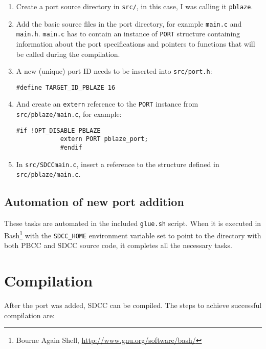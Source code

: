         \begin{enumerate}

        \item Create a port source directory in \texttt{src/}, in this case, I was calling it \texttt{pblaze}.

        \item Add the basic source files in the port directory, for example \texttt{main.c} and \texttt{main.h}. \texttt{main.c} has to contain an instance of \texttt{PORT} structure containing information about the port specifications and pointers to functions that will be called during the compilation.

        \item A new (unique) port ID needs to be inserted into \texttt{src/port.h}:

        \texttt{\#define TARGET\_ID\_PBLAZE    16}

        \item And create an \texttt{extern} reference to the \texttt{PORT} instance from \texttt{src/pblaze/main.c}, for example:

            \begin{verbatim}#if !OPT_DISABLE_PBLAZE
            extern PORT pblaze_port;
            #endif\end{verbatim}

        \item In \texttt{src/SDCCmain.c}, insert a reference to the structure defined in \texttt{src/pblaze/main.c}.

        \end{enumerate}

            \subsection{Automation of new port addition}

            These tasks are automated in the included \texttt{glue.sh} script. When it is executed in  Bash\footnote{Bourne Again Shell, \url{http://www.gnu.org/software/bash/}} with the \texttt{SDCC\_HOME} environment variable set to point to the directory with both PBCC and SDCC source code, it completes all the necessary tasks.

        \section{Compilation}

        After the port was added, SDCC can be compiled. The steps to achieve successful compilation are:

